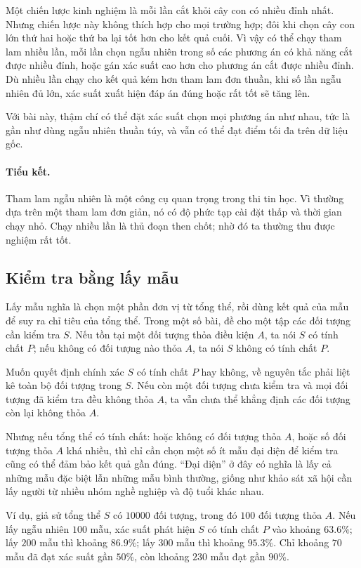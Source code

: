 \documentclass[11pt]{article}
\begin{document}
Một chiến lược kinh nghiệm là mỗi lần cắt khỏi cây con có nhiều đỉnh nhất.
Nhưng chiến lược này không thích hợp cho mọi trường hợp; đôi khi chọn cây con
lớn thứ hai hoặc thứ ba lại tốt hơn cho kết quả cuối. Vì vậy có thể chạy
tham lam nhiều lần, mỗi lần chọn ngẫu nhiên trong số các phương án có khả năng
cắt được nhiều đỉnh, hoặc gán xác suất cao hơn cho phương án cắt được nhiều
đỉnh. Dù nhiều lần chạy cho kết quả kém hơn tham lam đơn thuần, khi số lần
ngẫu nhiên đủ lớn, xác suất xuất hiện đáp án đúng hoặc rất tốt sẽ tăng lên.

Với bài này, thậm chí có thể đặt xác suất chọn mọi phương án như nhau, tức là
gần như dùng ngẫu nhiên thuần túy, và vẫn có thể đạt điểm tối đa trên dữ liệu
gốc.

\paragraph{Tiểu kết.}
Tham lam ngẫu nhiên là một công cụ quan trọng trong thi tin học. Vì thường dựa
trên một tham lam đơn giản, nó có độ phức tạp cài đặt thấp và thời gian chạy
nhỏ. Chạy nhiều lần là thủ đoạn then chốt; nhờ đó ta thường thu được nghiệm
rất tốt.

\subsection{Kiểm tra bằng lấy mẫu}

Lấy mẫu nghĩa là chọn một phần đơn vị từ tổng thể, rồi dùng kết quả của mẫu để
suy ra chỉ tiêu của tổng thể. Trong một số bài, đề cho một tập các đối tượng
cần kiểm tra $S$. Nếu tồn tại một đối tượng thỏa điều kiện $A$, ta nói $S$ có
tính chất $P$; nếu không có đối tượng nào thỏa $A$, ta nói $S$ không có tính
chất $P$.

Muốn quyết định chính xác $S$ có tính chất $P$ hay không, về nguyên tắc phải
liệt kê toàn bộ đối tượng trong $S$. Nếu còn một đối tượng chưa kiểm tra và
mọi đối tượng đã kiểm tra đều không thỏa $A$, ta vẫn chưa thể khẳng định các
đối tượng còn lại không thỏa $A$.

Nhưng nếu tổng thể có tính chất: hoặc không có đối tượng thỏa $A$, hoặc số đối
tượng thỏa $A$ khá nhiều, thì chỉ cần chọn một số ít mẫu đại diện để kiểm tra
cũng có thể đảm bảo kết quả gần đúng. ``Đại diện'' ở đây có nghĩa là lấy cả
những mẫu đặc biệt lẫn những mẫu bình thường, giống như khảo sát xã hội cần
lấy người từ nhiều nhóm nghề nghiệp và độ tuổi khác nhau.

Ví dụ, giả sử tổng thể $S$ có $10000$ đối tượng, trong đó $100$ đối tượng thỏa
$A$. Nếu lấy ngẫu nhiên $100$ mẫu, xác suất phát hiện $S$ có tính chất $P$ vào
khoảng $63.6\%$; lấy $200$ mẫu thì khoảng $86.9\%$; lấy $300$ mẫu thì khoảng
$95.3\%$. Chỉ khoảng $70$ mẫu đã đạt xác suất gần $50\%$, còn khoảng $230$ mẫu
đạt gần $90\%$.
\end{document}

